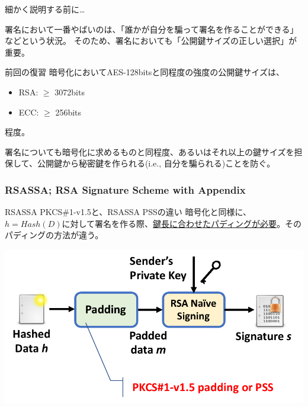 \documentclass[12pt,dvipdfmx]{beamer}
\begin{document}
\begin{frame}
細かく説明する前に…


\vspace{2ex}

署名において一番やばいのは、「誰かが自分を騙って署名を作ることができる」などという状況。
そのため、署名においても「公開鍵サイズの正しい選択」が重要。
\begin{block}{\small 前回の復習}
暗号化においてAES-128bitsと同程度の強度の公開鍵サイズは、
\begin{itemize}
\item RSA: $\geq$ 3072bits
\item ECC: $\geq$ 256bits
\end{itemize}
程度。
\end{block}
\alert{署名についても暗号化に求めるものと同程度、あるいはそれ以上の鍵サイズを担保}して、公開鍵から秘密鍵を作られる(i.e., 自分を騙られる)ことを防ぐ。
\end{frame}


\begin{frame}
\frametitle{RSASSA; RSA Signature Scheme with Appendix}
\begin{block}{\small RSASSA PKCS\#1-v1.5と、RSASSA PSSの違い}
暗号化と同様に、$h=\mathit{Hash}(D)$に対して署名を作る際、\underline{鍵長に合わせたパディングが必要}。そのパディングの方法が違う。
\end{block}

\begin{center}
\includegraphics[width=0.8\linewidth]{Figs/sig-rsa-padding.pdf}
\end{center}

\end{frame}
\end{document}
